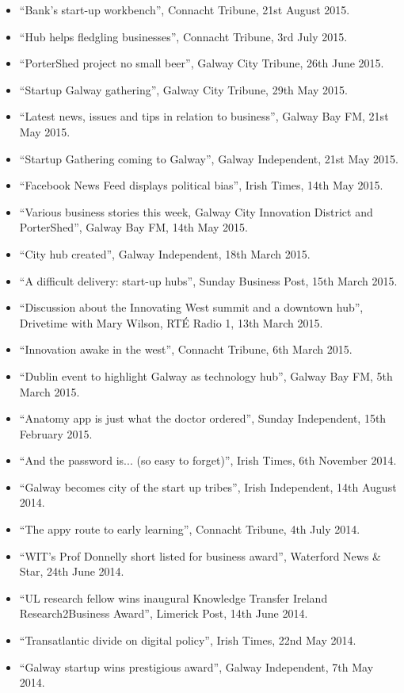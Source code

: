 \documentclass[10pt,a4paper]{res} %
\begin{document}
\begin{resume}
{\begin{itemize}
\item ``Bank's start-up workbench'', Connacht Tribune, 21st August 2015.
\item ``Hub helps fledgling businesses'', Connacht Tribune, 3rd July 2015.
\item ``PorterShed project no small beer'', Galway City Tribune, 26th June 2015.
\item ``Startup Galway gathering'', Galway City Tribune, 29th May 2015.
\item ``Latest news, issues and tips in relation to business'', Galway Bay FM, 21st May 2015.
\item ``Startup Gathering coming to Galway'', Galway Independent, 21st May 2015.
\item ``Facebook News Feed displays political bias'', Irish Times, 14th May 2015.
\item ``Various business stories this week, Galway City Innovation District and PorterShed'', Galway Bay FM, 14th May 2015.
\item ``City hub created'', Galway Independent, 18th March 2015.
\item ``A difficult delivery: start-up hubs'', Sunday Business Post, 15th March 2015.
\item ``Discussion about the Innovating West summit and a downtown hub'', Drivetime with Mary Wilson, RT\'{E} Radio 1, 13th March 2015.
\item ``Innovation awake in the west'', Connacht Tribune, 6th March 2015.
\item ``Dublin event to highlight Galway as technology hub'', Galway Bay FM, 5th March 2015.
\item ``Anatomy app is just what the doctor ordered'', Sunday Independent, 15th February 2015.
\item ``And the password is... (so easy to forget)'', Irish Times, 6th November 2014.
\item ``Galway becomes city of the start up tribes'', Irish Independent, 14th August 2014.
\item ``The appy route to early learning'', Connacht Tribune, 4th July 2014.
\item ``WIT's Prof Donnelly short listed for business award'', Waterford News \& Star, 24th June 2014.
\item ``UL research fellow wins inaugural Knowledge Transfer Ireland Research2Business Award'', Limerick Post, 14th June 2014.
\item ``Transatlantic divide on digital policy'', Irish Times, 22nd May 2014.
\item ``Galway startup wins prestigious award'', Galway Independent, 7th May 2014.

\end{itemize}}
\end{resume}
\end{document}
